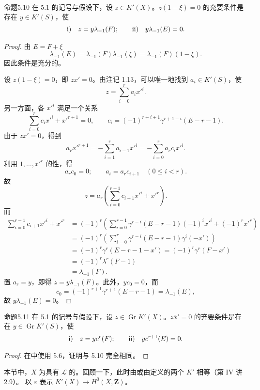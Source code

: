 \begin{SGAresult}{命题}{5.10}
在 5.1 的记号与假设下，设 $z\in K'(X)$。$z(1-\xi)=0$ 的充要条件是存在 $y\in K'(S)$，使
\[
\textup{i)}\quad z=y\lambda_{-1}(F);\qquad
\textup{ii)}\quad y\lambda_{-1}(E)=0.
\]
\end{SGAresult}
\begin{proof}
由 $E=F+\xi$ 
\[
\lambda_{-1}(E)=\lambda_{-1}(F)\lambda_{-1}(\xi)=\lambda_{-1}(F)(1-\xi).
\]
因此条件是充分的。

设 $z(1-\xi)=0$，即 $zx'=0$。由注记 1.13，可以唯一地找到 $a_i\in K'(S)$，使
\[
z=\sum_{i=0}^r a_i x'^i.
\]
另一方面，各 $x'^i$ 满足一个关系
\[
\sum_{i=0}^r c_i x'^i+x'^{r+1}=0,\qquad
c_i=(-1)^{r+i+1}\gamma^{r+1-i}(E-r-1).
\]
由于 $zx'=0$，得到
\[
a_rx'^{r+1}=-\sum_{i=1}^r a_{i-1}x'^i=-\sum_{i=0}^r a_rc_i x'^i.
\]
利用 $1,\ldots,x'^r$ 的性，得
\[
a_rc_0=0;\qquad a_i=a_rc_{i+1}\quad(0\leq i<r).
\]
故
\[
z=a_r\left(\sum_{i=0}^{r-1}c_{i+1}x'^i+x'^r\right).
\]
而
\[
\begin{aligned}
\sum_{i=0}^{r-1}c_{i+1}x'^i+x'^r
&=(-1)^r\left(\sum_{i=0}^{r-1}\gamma^{r-i}(E-r-1)(-1)^ix'^i+(-1)^rx'^r\right)\\
&=(-1)^r\left(\sum_{i=0}^r\gamma^{r-i}(E-r-1)\gamma^i(-x')\right)\\
&=(-1)^r\gamma^r(E-r-1-x')=(-1)^r\gamma^r(F-x')\\
&=(-1)^r\lambda^r(F-1)\\
&=\lambda_{-1}(F).
\end{aligned}
\]
置 $a_r=y$，即得 $z=y\lambda_{-1}(F)$。此外，$yc_0=0$，而
\[
c_0=(-1)^{r+1}\gamma^{r+1}(E-r-1)=\lambda_{-1}(E),
\]
故 $y\lambda_{-1}(E)=0$。
\end{proof}

\begin{SGAresult}{命题}{5.11}
在 5.1 的记号与假设下，设 $z\in\operatorname{Gr}K'(X)$。$z\bar x'=0$ 的充要条件是存在 $y\in\operatorname{Gr}K'(S)$，使
\[
\textup{i)}\quad z=yc^r(F);\qquad
\textup{ii)}\quad yc^{r+1}(E)=0.
\]
\end{SGAresult}
\begin{proof}
在中使用 5.6，证明与 5.10 完全相同。
\end{proof}

本节中，$X$ 为具有 $\mathcal L$ 的。回顾一下，此时由或由定义的两个 $K'$ 相等（第 IV 讲 2.9）。
以 $\varepsilon$ 表示 $K'(X)\longrightarrow H^0(X,\mathbf Z)$。

